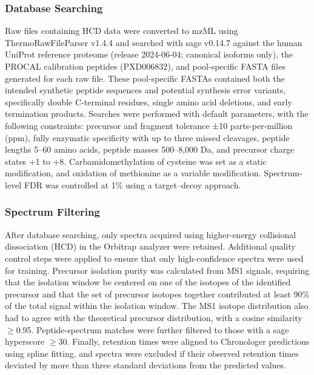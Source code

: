 \documentclass[pdflatex,sn-nature]{sn-jnl}
\begin{document}
\subsubsection{Database Searching}\label{subsubsec:database-searching}
Raw files containing HCD data were converted to mzML using ThermoRawFileParser v1.4.4 and searched with sage v0.14.7 against the human UniProt reference proteome (release 2024-06-04; canonical isoforms only), the PROCAL calibration peptides (PXD006832), and pool-specific FASTA files generated for each raw file. These pool-specific FASTAs contained both the intended synthetic peptide sequences and potential synthesis error variants, specifically double C-terminal residues, single amino acid deletions, and early termination products.
Searches were performed with default parameters, with the following constraints: precursor and fragment tolerance ±10 parts-per-million (ppm), fully enzymatic specificity with up to three missed cleavages, peptide lengths 5–60 amino acids, peptide masses 500–8,000 Da, and precursor charge states +1 to +8. Carbamidomethylation of cysteine was set as a static modification, and oxidation of methionine as a variable modification. Spectrum-level FDR was controlled at 1\% using a target–decoy approach.

\subsubsection{Spectrum Filtering}\label{subsubsec:spectrum-filtering}
After database searching, only spectra acquired using higher-energy collisional dissociation (HCD) in the Orbitrap analyzer were retained. Additional quality control steps were applied to ensure that only high-confidence spectra were used for training. Precursor isolation purity was calculated from MS1 signals, requiring that the isolation window be centered on one of the isotopes of the identified precursor and that the set of precursor isotopes together contributed at least 90\% of the total signal within the isolation window. The MS1 isotope distribution also had to agree with the theoretical precursor distribution, with a cosine similarity $\geq$0.95. Peptide-spectrum matches were further filtered to those with a sage hyperscore $\geq$30. Finally, retention times were aligned to Chronologer predictions using spline fitting, and spectra were excluded if their observed retention times deviated by more than three standard deviations from the predicted values.
\end{document}
